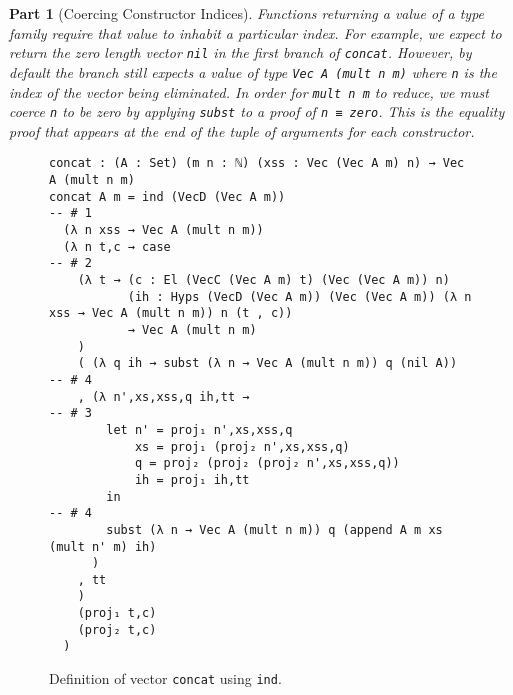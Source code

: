 \documentclass[preprint,nonatbib]{sigplanconf}
\newtheorem{mypart}{Part}
\begin{document}
\begin{mypart}[Coercing Constructor Indices]
\label{part:four}
Functions returning a value of a type family require that value to
inhabit a particular index. For example, we expect to return the zero
length vector {\tt nil} in the first branch of {\tt concat}.
However, by default the branch still expects a value of type
{\tt Vec A (mult n m)} where {\tt n} is the index of the vector being
eliminated. In order for {\tt mult n m} to reduce, we must coerce {\tt n}
to be zero by applying {\tt subst} to a proof of {\tt n ≡ zero}. This
is the equality proof that appears at the end of the tuple of
arguments for each constructor.
\end{mypart}


\begin{figure*}
\caption{Definition of vector {\tt concat} using {\tt ind}.}
\label{fig:ind:concat}

\begin{verbatim}
concat : (A : Set) (m n : ℕ) (xss : Vec (Vec A m) n) → Vec A (mult n m)
concat A m = ind (VecD (Vec A m))                              -- # 1
  (λ n xss → Vec A (mult n m))
  (λ n t,c → case                                              -- # 2
    (λ t → (c : El (VecC (Vec A m) t) (Vec (Vec A m)) n)
           (ih : Hyps (VecD (Vec A m)) (Vec (Vec A m)) (λ n xss → Vec A (mult n m)) n (t , c))
           → Vec A (mult n m)
    )
    ( (λ q ih → subst (λ n → Vec A (mult n m)) q (nil A))     -- # 4
    , (λ n',xs,xss,q ih,tt →                                  -- # 3
        let n' = proj₁ n',xs,xss,q
            xs = proj₁ (proj₂ n',xs,xss,q)
            q = proj₂ (proj₂ (proj₂ n',xs,xss,q))
            ih = proj₁ ih,tt
        in                                                     -- # 4
        subst (λ n → Vec A (mult n m)) q (append A m xs (mult n' m) ih)
      )
    , tt
    )
    (proj₁ t,c)
    (proj₂ t,c)
  )
\end{verbatim}

\end{figure*}
\end{document}
